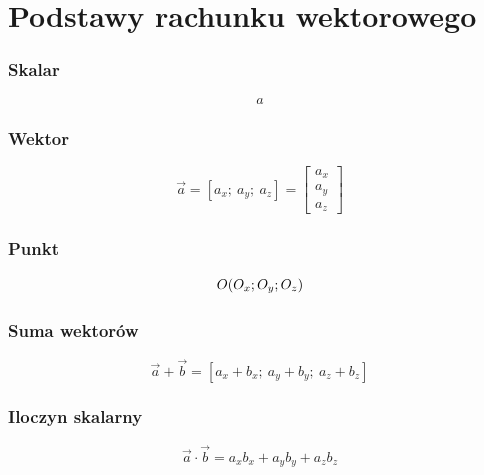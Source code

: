 \section{Podstawy rachunku wektorowego}

\subsubsection*{Skalar}

\begin{equation}
    a
\end{equation}

\subsubsection*{Wektor}

\begin{equation}
    \Vec{a} = [ a_x;\ a_y;\ a_z ] = \begin{bmatrix} a_x \\ a_y \\ a_z \end{bmatrix}
\end{equation}

\subsubsection*{Punkt}

\begin{equation}
    O( O_x;\\ O_y;\\ O_z )
\end{equation}

\subsubsection*{Suma wektorów}

\begin{equation}
    \Vec{a} + \Vec{b} = [ a_x + b_x;\ a_y + b_y;\ a_z + b_z ]
\end{equation}

\subsubsection*{Iloczyn skalarny}

\begin{equation}
    \Vec{a} \cdot \Vec{b} = a_x b_x + a_y b_y + a_z b_z
\end{equation}


